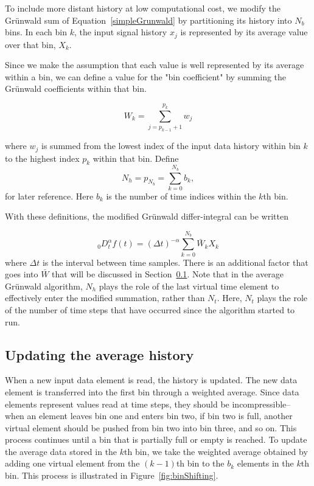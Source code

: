 To include more distant history at low computational cost, we modify
the Gr{\"u}nwald sum of Equation~\ref{simpleGrunwald} by partitioning its
history into $N_b$ bins. In each bin $k$, the input signal history
$x_j$ is represented by its average value over that bin, $X_k$.

Since we make the assumption that each value is well represented by
its average within a bin, we can define a value for the "bin
coefficient" by summing the Gr{\"u}nwald coefficients within that bin.

\begin{equation}
W_k = \displaystyle\sum\limits_{j=p_{k-1}+1}^{p_k} w_j
\label{eqn:sumWk}
\end{equation}

\noindent where $w_j$ is summed from the lowest index of the input data history within bin $k$ to the highest index $p_k$ within that bin. Define
\begin{equation}
N_h=p_{N_b}=\displaystyle\sum_{k=0}^{N_b}b_k,
\label{eqn:Nh}
\end{equation}
for later reference. Here $b_k$ is the number of time indices within the $k$th bin. 

With these definitions, the modified Gr{\"u}nwald differ-integral can be written

\begin{equation}
_0D^\alpha_t f(t) = \displaystyle(\Delta t)^{-\alpha}\sum\limits_{k=0}^{N_b}\bar{W}_kX_k
\label{avgSimpleGrunwald}
\end{equation}
where $\Delta t$ is the interval between time samples. There is an additional factor that goes into $\bar{W}$ that will be discussed in Section~\ref{sec:shifting}. Note that in the average Gr{\"u}nwald algorithm, $N_h$ plays the role of the last virtual time element to effectively enter the modified summation, rather than $N_t$. Here, $N_t$ plays the role of the number of time steps that have occurred since the algorithm started to run. 



\subsection{Updating the average history}
\label{sec:shifting}

When a new input data element is read, the history is updated. The new data element is transferred into the first bin through a weighted average. Since data elements represent values read at time steps, they should be incompressible-- when an element leaves bin one and enters bin two, if bin two is full, another virtual element should be pushed from bin two into bin three, and so on. This process continues until a bin that is partially full or empty is reached. To update the average data stored in the $k$th bin, we take the weighted average obtained by adding one virtual element from the $(k-1)$th bin to the $b_k$ elements in the $k$th bin. This process is illustrated in Figure~\ref{fig:binShifting}.

